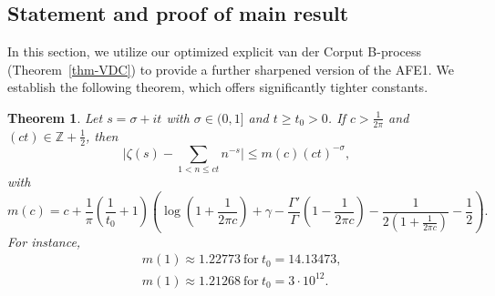 \documentclass[11pt,letterpaper,oneside,reqno]{amsart}
\renewcommand{\^}[1]{\widehat{#1}}
\newcommand{\Z}{{\mathbb{Z}}}
\newcommand{\s}{\sigma}
\numberwithin{equation}{section}
\newtheorem{theorem}{Theorem}
\theoremstyle{remark}
\newcommand*{\thmref}[1]{Theorem~\ref{#1}}
\begin{document}
\subsection{Statement and proof of main result}
In this section, we utilize our optimized explicit van der Corput B-process (\thmref{thm-VDC}) to provide a further sharpened version of the AFE1. We establish the following theorem, which offers significantly tighter constants.
%
\begin{theorem} \label{thm-AFE1}
Let $s = \sigma + it$ with $\s \in (0,1]$ and $t \geq t_0>0$. If $c>\frac{1}{2\pi}$ and $(ct)\in\Z+\frac{1}{2}$, then
\begin{equation*} \bigg|  \zeta(s)
    - \sum_{1<n\leq ct}n^{-s} \bigg|  
    \leq m (c) (ct)^{-\s}  ,
\end{equation*}
with 
\begin{equation}
\label{def-m-AEF1}
m (c) = c + \frac{1}{\pi }  \left( \frac{1}{t_0} + 1 \right) \left(  \log \left(1+\frac{1}{2\pi c} \right) + \gamma - \frac{\Gamma'}{\Gamma}\left(1-\frac{1}{2\pi c}\right)  - \frac{1}{2(1+\frac{1}{2\pi c})}-\frac{1}{2}\right).
\end{equation}
For instance,
\begin{align}
& m(1) \approx 1.22773 \ \text{for} \ t_0=14.13473,    \\
&m(1) \approx 1.21268 \ \text{for} \  t_0=3\cdot10^{12}.
\end{align}
\end{theorem}
%
\end{document}
